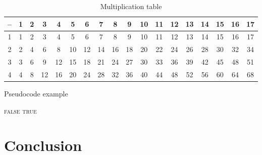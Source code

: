 \documentclass{nus-student-qe}
\begin{document}
	\begin{table}[!h]
		\caption{Multiplication table}
		\label{table:mul-table}
		\centering
		\begin{tabular}{|*{18}{c|}}\hline
			-- & 1 & 2 & 3 & 4 & 5 & 6 & 7 & 8 & 9 & 10 & 11 & 12 & 13 & 14 & 15 & 16 & 17 \\\hline
			1  & 1 & 2 & 3 & 4 & 5 & 6 & 7 & 8 & 9 & 10 & 11 & 12 & 13 & 14 & 15 & 16 & 17 \\\hline
			2  & 2 & 4 & 6 & 8 & 10 & 12 & 14 & 16 & 18 & 20 & 22 & 24 & 26 & 28 & 30 & 32 & 34 \\\hline
			3  & 3 & 6 & 9 & 12 & 15 & 18 & 21 & 24 & 27 & 30 & 33 & 36 & 39 & 42 & 45 & 48 & 51 \\\hline
			4  & 4 & 8 & 12 & 16 & 20 & 24 & 28 & 32 & 36 & 40 & 44 & 48 & 52 & 56 & 60 & 64 & 68 \\\hline
		\end{tabular}
	\end{table}
	
	
	\begin{algorithm}[!h]
		\caption{Pseudocode example}
		\label{alg:pseudocode}
		\begin{algorithmic}
			\State\Return \textsc{false}
			\EndIf
			\EndFor
			\State\Return \textsc{true}
			\EndFunction
		\end{algorithmic}
	\end{algorithm}
	
	\chapter{Conclusion}
	\lipsum[1]
	
	
\end{document}
